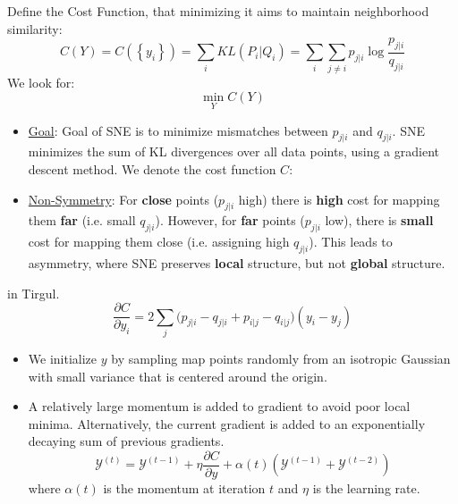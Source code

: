 \documentclass{article}
\begin{document}
\begin{definition} 
Define the Cost Function, that minimizing it aims to maintain neighborhood similarity:
\[
 C(Y) = C( \left\{ y_i \right\}) = \sum_{i} KL(P_i | Q_i) = \sum_{i} \sum_{j \neq i} p_{j | i} \log \frac{p_{j|i}}{q_{j|i}}
\] 
We look for:
\[
  \min_{Y} C(Y)  
\]
\begin{itemize}

  \item \ul{Goal}: Goal of SNE is to minimize mismatches between $p_{j|i}$ and $q_{j|i}$. 
 SNE minimizes the sum of KL divergences over all data points, using a gradient descent method. We denote the cost function $C$:
  \item \ul{Non-Symmetry}: For \textbf{close} points ($p_{j|i}$ high) there is \textbf{high} cost for mapping them \textbf{far} (i.e. small $q_{j|i}$). However, for \textbf{far} points ($p_{j|i}$ low), there is \textbf{small} cost for mapping them close (i.e. assigning high $q_{j|i}$). This leads to asymmetry, where SNE preserves \textbf{local} structure, but not \textbf{global} structure. 
\end{itemize}
\end{definition}

\begin{theorem} in Tirgul. 
\[
  \frac{\partial C}{\partial y_i} = 2 \sum_{j} \big( p_{j|i} - q_{j|i} + p_{i|j} -q_{i|j} \big)( y_i - y_j)
\]
\end{theorem}


\begin{theorem} \hphantom{}
\begin{itemize}

  \item We initialize  $y$ by sampling map points randomly from an isotropic Gaussian with small variance that is centered around the origin. 
  \item A relatively large momentum is added to gradient to avoid poor local minima. Alternatively, the current gradient is added to an exponentially decaying sum of previous gradients.
\[
    \mathcal{Y}^{(t)} = \mathcal{Y}^{(t-1)} + \eta \frac{\partial C}{\partial y} + \alpha(t) (\mathcal{Y}^{(t-1)} + \mathcal{Y}^{(t-2)} ) 
\]
  where $\alpha(t)$ is the momentum at iteration $t$ and $\eta$ is the learning rate.  

\end{itemize}

\end{theorem}
\end{document}
